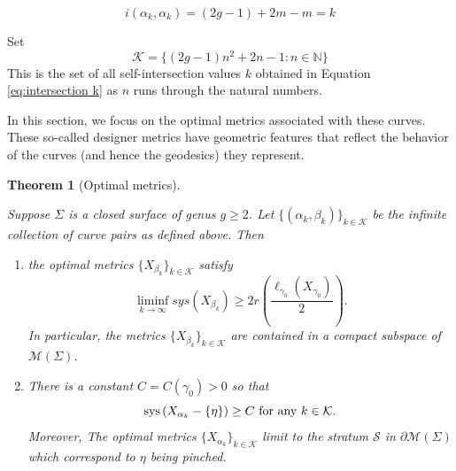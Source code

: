 \documentclass[12pt]{amsart}
\numberwithin{equation}{section}
\theoremstyle{plain}
\newtheorem{thm}{Theorem}[section]
\begin{document}
$$i(\alpha_{k}, \alpha_{k})=(2g-1) +2m - m = k$$ 


Set $$\mathcal{K} = \{(2g-1)n^{2} +2n - 1 : n \in \mathbb{N} \}$$ 
This is the set of all self-intersection  values  $k$ obtained in Equation \ref{eq:intersection k} as $n$ runs through the natural numbers.

In this section, we focus on the optimal  metrics associated with these curves. These so-called designer metrics have geometric features that reflect the behavior of the curves (and hence the geodesics) they represent. 


\begin{thm}[Optimal metrics] 
\label{thm: sepoptimalmetric}

Suppose $ \Sigma$ is a closed surface of genus $g \geq 2$.  Let  $\{(\alpha_{k},\beta_{k})\}_{k \in \mathcal{K}}$ be the infinite collection of curve pairs as defined above. Then 


\begin{enumerate}

\item the optimal metrics $\{X_{\beta_{k}}\}_{k  \in \mathcal{K}}$ satisfy
$$ \liminf_{k \rightarrow \infty} sys(X_{\beta_{k}}) 
\geq 2 r\left(\frac{\ell_{{\gamma}_{0}}(X_{\gamma_0})}{2}\right).$$
In particular, the metrics $\{X_{\beta_{k}}\}_{k  \in \mathcal{K}}$
are contained in a  compact subspace of $\mathcal{M}(\Sigma)$.


\item  There is a constant $C=C(\gamma_0)>0$ so that   
\begin{displaymath}
\textup{sys}\left(X_{\alpha_{k}}-\{\eta\}\right) \geq C \text{ for  any  $k  \in \mathcal{K}$}.
\end{displaymath}
Moreover,  The optimal metrics $\{X_{\alpha_{k}}\}_{k  \in \mathcal{K}}$ limit  to the stratum $\mathcal{S}$ in $\partial\mathcal{M}(\Sigma)$ which
 correspond  to  $\eta$ being pinched.
\end{enumerate}

\end{thm}
\end{document}
